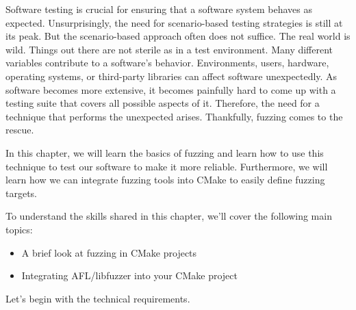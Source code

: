 Software testing is crucial for ensuring that a software system behaves as expected. Unsurprisingly, the need for scenario-based testing strategies is still at its peak. But the scenario-based approach often does not suffice. The real world is wild. Things out there are not sterile as in a test environment. Many different variables contribute to a software's behavior. Environments, users, hardware, operating systems, or third-party libraries can affect software unexpectedly. As software becomes more extensive, it becomes painfully hard to come up with a testing suite that covers all possible aspects of it. Therefore, the need for a technique that performs the unexpected arises. Thankfully, fuzzing comes to the rescue.

In this chapter, we will learn the basics of fuzzing and learn how to use this technique 
to test our software to make it more reliable. Furthermore, we will learn how we can integrate fuzzing tools into CMake to easily define fuzzing targets.

To understand the skills shared in this chapter, we'll cover the following main topics:

\begin{itemize}
\item 
A brief look at fuzzing in CMake projects

\item 
Integrating AFL/libfuzzer into your CMake project
\end{itemize}

Let's begin with the technical requirements.
























